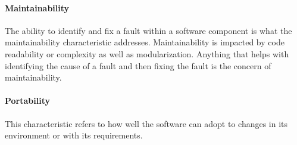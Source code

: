 \paragraph{Maintainability}
The ability to identify and fix a fault within a software component is what the maintainability characteristic addresses. Maintainability is impacted by code readability or complexity as well as modularization. Anything that helps with identifying the cause of a fault and then fixing the fault is the concern of maintainability.

\paragraph{Portability}
This characteristic refers to how well the software can adopt to changes in its environment or with its requirements. 